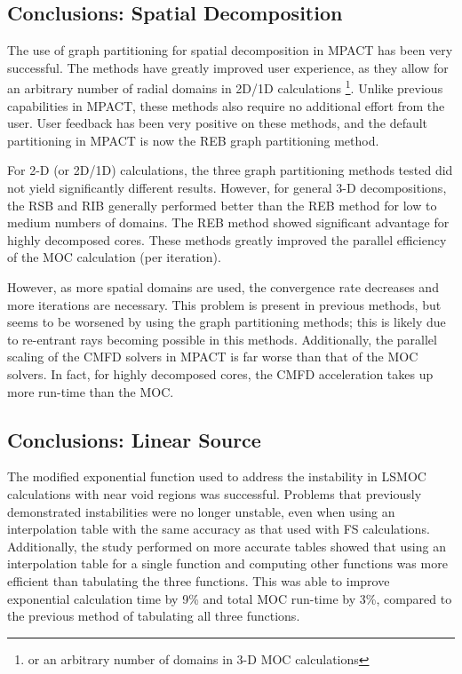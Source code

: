 {{    \subsection{Conclusions: Spatial Decomposition}{\label{ssec:Conclusions:Spatial Decomposition}
      The use of graph partitioning for spatial decomposition in MPACT has been very successful.
      The methods have greatly improved user experience, as they allow for an arbitrary number of radial domains in 2D/1D calculations \footnote{or an arbitrary number of domains in 3-D \ac{MOC} calculations}.
      Unlike previous capabilities in MPACT, these methods also require no additional effort from the user.
      User feedback has been very positive on these methods, and the default partitioning in MPACT is now the \ac{REB} graph partitioning method.

      For 2-D (or 2D/1D) calculations, the three graph partitioning methods tested did not yield significantly different results.
      However, for general 3-D decompositions, the \ac{RSB} and \ac{RIB} generally performed better than the \ac{REB} method for low to medium numbers of domains.
      The \ac{REB} method showed significant advantage for highly decomposed cores.
      These methods greatly improved the parallel efficiency of the \ac{MOC} calculation (per iteration).

      However, as more spatial domains are used, the convergence rate decreases and more iterations are necessary.
      This problem is present in previous methods, but seems to be worsened by using the graph partitioning methods; this is likely due to re-entrant rays becoming possible in this methods.
      Additionally, the parallel scaling of the \ac{CMFD} solvers in MPACT is far worse than that of the \ac{MOC} solvers.
      In fact, for highly decomposed cores, the \ac{CMFD} acceleration takes up more run-time than the \ac{MOC}.
    }

    \subsection{Conclusions: Linear Source}{\label{ssec:Conclusions:Linear Source}
      The modified exponential function used to address the instability in \ac{LSMOC} calculations with near void regions was successful.
      Problems that previously demonstrated instabilities were no longer unstable, even when using an interpolation table with the same accuracy as that used with \ac{FS} calculations.
      Additionally, the study performed on more accurate tables showed that using an interpolation table for a single function and computing other functions was more efficient than tabulating the three functions.
      This was able to improve exponential calculation time by 9\% and total \ac{MOC} run-time by 3\%, compared to the previous method of tabulating all three functions.

}}}
